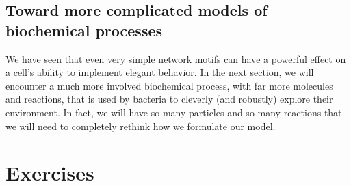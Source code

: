 \FloatBarrier
{}
\subsection{Toward more complicated models of biochemical processes}

We have seen that even very simple network motifs can have a powerful effect on a cell's ability to implement elegant behavior. In the next section, we will encounter a much more involved biochemical process, with far more molecules and reactions, that is used by bacteria to cleverly (and robustly) explore their environment. In fact, we will have so many particles and so many reactions that we will need to completely rethink how we formulate our model.

\FloatBarrier
\section{Exercises}
\label{sec:exercises}

\begin{exercise}\end{exercise}
